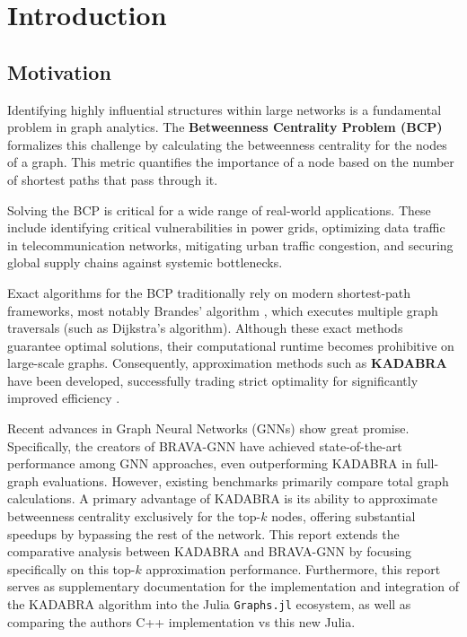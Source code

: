 \chapter{Introduction}

\section{Motivation}Identifying highly influential structures within large networks is a fundamental problem in graph analytics.
The \textbf{Betweenness Centrality Problem (BCP)} formalizes this challenge by calculating the betweenness centrality for the nodes of a graph.
This metric quantifies the importance of a node based on the number of shortest paths that pass through it.

Solving the BCP is critical for a wide range of real-world applications.
These include identifying critical vulnerabilities in power grids, optimizing data traffic in telecommunication networks,
mitigating urban traffic congestion, and securing global supply chains against systemic bottlenecks.

Exact algorithms for the BCP traditionally rely on modern shortest-path frameworks,
most notably Brandes' algorithm \parencite{brandes_faster_2001}, which executes multiple graph traversals (such as Dijkstra's algorithm).
Although these exact methods guarantee optimal solutions, their computational runtime becomes prohibitive on large-scale graphs.
Consequently, approximation methods such as \textbf{KADABRA} have been developed, successfully trading strict optimality for significantly
improved efficiency \parencite{borassi_kadabra_2019}.

Recent advances in Graph Neural Networks (GNNs) show great promise.
Specifically, the creators of BRAVA-GNN \parencite{noauthor_degree-mass_2026} have achieved state-of-the-art performance among GNN approaches,
even outperforming KADABRA in full-graph evaluations.
However, existing benchmarks primarily compare total graph calculations.
A primary advantage of KADABRA is its ability to approximate betweenness centrality exclusively for the top-$k$ nodes,
offering substantial speedups by bypassing the rest of the network.
This report extends the comparative analysis between KADABRA and BRAVA-GNN by focusing specifically on this top-$k$ approximation
performance. Furthermore, this report serves as supplementary documentation for the implementation and integration of the KADABRA
algorithm into the Julia \texttt{Graphs.jl} ecosystem, as well as comparing the authors C++ implementation vs this new Julia.

